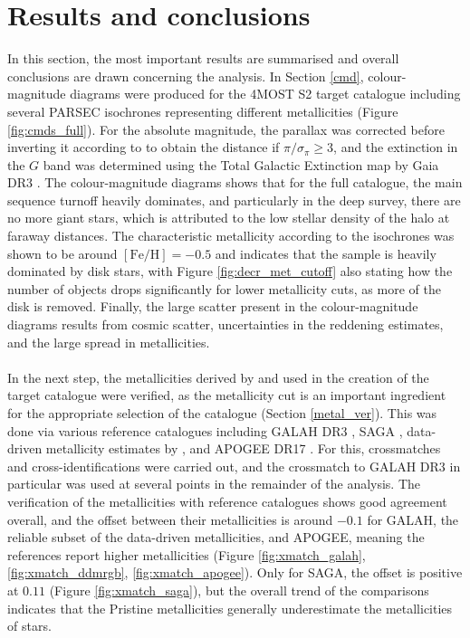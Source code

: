 \documentclass[a4paper,11pt]{article}
\begin{document}
\section{Results and conclusions} \label{results}
In this section, the most important results are summarised and overall conclusions are drawn concerning the analysis. In Section \ref{cmd}, colour-magnitude diagrams were produced for the 4MOST S2 target catalogue including several PARSEC isochrones \citep{parsec} representing different metallicities (Figure \ref{fig:cmds_full}). For the absolute magnitude, the parallax was corrected before inverting it according to \citet{lindegren21b} to obtain the distance if $\pi/\sigma_\pi\geq3$, and the extinction in the $G$ band was determined using the Total Galactic Extinction map by Gaia DR3 \citep{delchambre23}. The colour-magnitude diagrams shows that for the full catalogue, the main sequence turnoff heavily dominates, and particularly in the deep survey, there are no more giant stars, which is attributed to the low stellar density of the halo at faraway distances. The characteristic metallicity according to the isochrones was shown to be around $\mathrm{[Fe/H]}=-0.5$ and indicates that the sample is heavily dominated by disk stars, with Figure \ref{fig:decr_met_cutoff} also stating how the number of objects drops significantly for lower metallicity cuts, as more of the disk is removed. Finally, the large scatter present in the colour-magnitude diagrams results from cosmic scatter, uncertainties in the reddening estimates, and the large spread in metallicities. 
\\ \\
%
In the next step, the metallicities derived by \citet{pristinegaia} and used in the creation of the target catalogue were verified, as the metallicity cut is an important ingredient for the appropriate selection of the catalogue (Section \ref{metal_ver}). This was done via various reference catalogues including GALAH DR3 \citep{galahdr3}, SAGA \citep{saga}, data-driven metallicity estimates by \citet{andrae23}, and APOGEE DR17 \citep{apogee}. For this, crossmatches and cross-identifications were carried out, and the crossmatch to GALAH DR3 in particular was used at several points in the remainder of the analysis. The verification of the \citet{pristinegaia} metallicities with reference catalogues shows good agreement overall, and the offset between their metallicities is around $-0.1$ for GALAH, the reliable subset of the data-driven metallicities, and APOGEE, meaning the references report higher metallicities (Figure \ref{fig:xmatch_galah}, \ref{fig:xmatch_ddmrgb}, \ref{fig:xmatch_apogee}). Only for SAGA, the offset is positive at $0.11$ (Figure \ref{fig:xmatch_saga}), but the overall trend of the comparisons indicates that the Pristine metallicities generally underestimate the metallicities of stars.\\ \\
\end{document}
